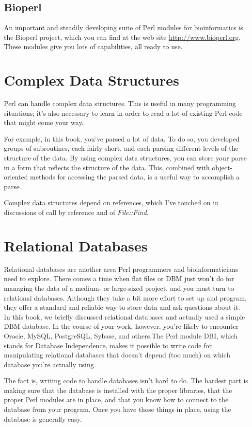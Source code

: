 \subsection{Bioperl}
An important and steadily developing suite of Perl modules for bioinformatics is the Bioperl project, which you can find at the web site \href{http://www.bioperl.org}{http://www.bioperl.org}. These modules give you lots of capabilities, all ready to use.

\section{Complex Data Structures}
Perl can handle complex data structures. This is useful in many programming situations; it's also necessary to learn in order to read a lot of existing Perl code that might come your way.

For example, in this book, you've parsed a lot of data. To do so, you developed groups of subroutines, each fairly short, and each parsing different levels of the structure of the data. By using complex data structures, you can store your parse in a form that reflects the structure of the data. This, combined with object-oriented methods for accessing the parsed data, is a useful way to accomplish a parse.

Complex data structures depend on references, which I've touched on in discussions of call by reference and of \textit{File::Find}.

\section{Relational Databases}
Relational databases are another area Perl programmers and bioinformaticians need to explore. There comes a time when flat files or DBM just won't do for managing the data of a medium- or large-sized project, and you must turn to relational databases. Although they take a bit more effort to set up and program, they offer a standard and reliable way to store data and ask questions about it. In this book, we briefly discussed relational databases and actually used a simple DBM database. In the course of your work, however, you're likely to encounter Oracle, MySQL, PostgreSQL, Sybase, and others.The Perl module DBI, which stands for Database Independence, makes it possible to write code for manipulating relational databases that doesn't depend (too much) on which database you're actually using.

The fact is, writing code to handle databases isn't hard to do. The hardest part is making sure that the database is installed with the proper libraries, that the proper Perl modules are in place, and that you know how to connect to the database from your program. Once you have those things in place, using the database is generally easy.

